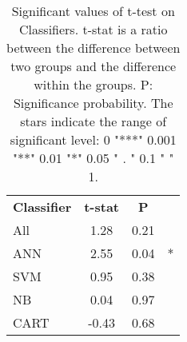 

\begin{table}[htbp]
\begin{center}
\begin{tabular}{|l|c|c|c}
\cline{1-3}
\textbf{Classifier} & \textbf{t-stat} & \textbf{P}\\
\cline{1-3}
          All &   1.28 &   0.21 &    \\
          ANN &   2.55 &   0.04  &  * \\
          SVM &   0.95 &   0.38 &   \\
          NB &   0.04 &   0.97 &     \\
          CART &   -0.43 &  0.68 &   \\
\cline{1-3}
\end{tabular}
\caption[]
{\small
  Significant values of t-test on Classifiers.  t-stat is a ratio between the difference between two groups and the difference within the groups. P: Significance probability. The stars indicate the range of significant level: 0 "***" 0.001 "**" 0.01 "*" 0.05 " . " 0.1 " " 1.
}
\label{table:ttest_result}
\end{center}
\end{table}


%
